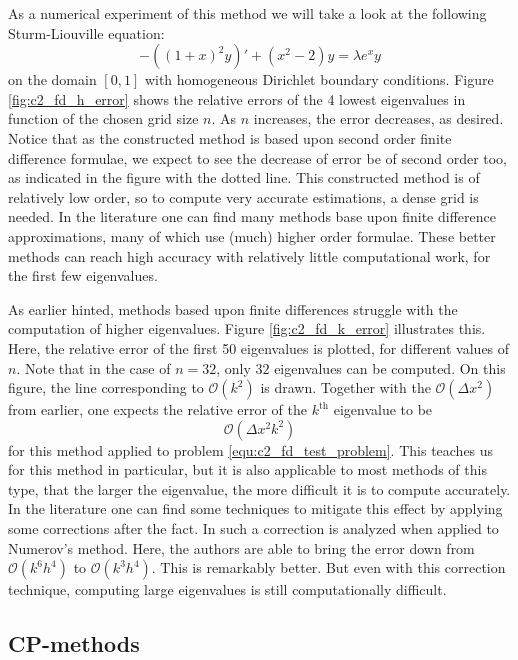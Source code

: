 As a numerical experiment of this method we will take a look at the following Sturm-Liouville equation:
\begin{equation}\label{equ:c2_fd_test_problem}
    -\left((1+x)^2 y \right)' + (x^2 - 2) y = \lambda e^x y
\end{equation}
on the domain $[0, 1]$ with homogeneous Dirichlet boundary conditions. Figure \ref{fig:c2_fd_h_error} shows the relative errors of the 4 lowest eigenvalues in function of the chosen grid size $n$. As $n$ increases, the error decreases, as desired. Notice that as the constructed method is based upon second order finite difference formulae, we expect to see the decrease of error be of second order too, as indicated in the figure with the dotted line. This constructed method is of relatively low order, so to compute very accurate estimations, a dense grid is needed. In the literature one can find many methods base upon finite difference approximations, many of which use (much) higher order formulae. These better methods can reach high accuracy with relatively little computational work, for the first few eigenvalues.

As earlier hinted, methods based upon finite differences struggle with the computation of higher eigenvalues. Figure \ref{fig:c2_fd_k_error} illustrates this. Here, the relative error of the first 50 eigenvalues is plotted, for different values of $n$. Note that in the case of $n = 32$, only $32$ eigenvalues can be computed. On this figure, the line corresponding to $\mathcal{O}(k^2)$ is drawn. Together with the $\mathcal{O}(\Delta x^2)$ from earlier, one expects the relative error of the $k^\text{th}$ eigenvalue to be
$$
    \mathcal{O}(\Delta x^2 k^2)
$$
for this method applied to problem \eqref{equ:c2_fd_test_problem}. This teaches us for this method in particular, but it is also applicable to most methods of this type, that the larger the eigenvalue, the more difficult it is to compute accurately. In the literature one can find some techniques to mitigate this effect by applying some corrections after the fact. In \cite{andrew_correction_1985} such a correction is analyzed when applied to Numerov's method. Here, the authors are able to bring the error down from $\mathcal{O}(k^6 h^4)$ to $\mathcal{O}(k^3 h^4)$. This is remarkably better. But even with this correction technique, computing large eigenvalues is still computationally difficult.

\subsection{CP-methods}

